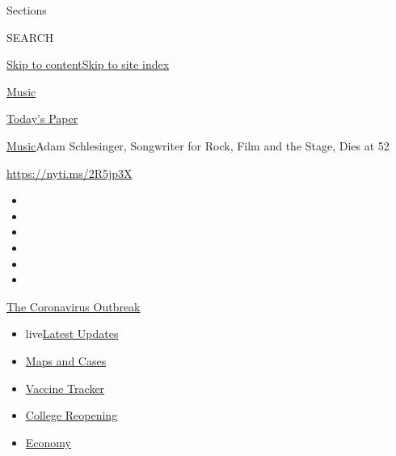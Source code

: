 Sections

SEARCH

\protect\hyperlink{site-content}{Skip to
content}\protect\hyperlink{site-index}{Skip to site index}

\href{https://www.nytimes.com/section/arts/music}{Music}

\href{https://myaccount.nytimes.com/auth/login?response_type=cookie\&client_id=vi}{}

\href{https://www.nytimes.com/section/todayspaper}{Today's Paper}

\href{/section/arts/music}{Music}\textbar{}Adam Schlesinger, Songwriter
for Rock, Film and the Stage, Dies at 52

\url{https://nyti.ms/2R5jp3X}

\begin{itemize}
\item
\item
\item
\item
\item
\item
\end{itemize}

\href{https://www.nytimes.com/news-event/coronavirus?action=click\&pgtype=Article\&state=default\&region=TOP_BANNER\&context=storylines_menu}{The
Coronavirus Outbreak}

\begin{itemize}
\tightlist
\item
  live\href{https://www.nytimes.com/2020/08/03/world/coronavirus-covid-19.html?action=click\&pgtype=Article\&state=default\&region=TOP_BANNER\&context=storylines_menu}{Latest
  Updates}
\item
  \href{https://www.nytimes.com/interactive/2020/us/coronavirus-us-cases.html?action=click\&pgtype=Article\&state=default\&region=TOP_BANNER\&context=storylines_menu}{Maps
  and Cases}
\item
  \href{https://www.nytimes.com/interactive/2020/science/coronavirus-vaccine-tracker.html?action=click\&pgtype=Article\&state=default\&region=TOP_BANNER\&context=storylines_menu}{Vaccine
  Tracker}
\item
  \href{https://www.nytimes.com/2020/08/02/us/covid-college-reopening.html?action=click\&pgtype=Article\&state=default\&region=TOP_BANNER\&context=storylines_menu}{College
  Reopening}
\item
  \href{https://www.nytimes.com/live/2020/08/03/business/stock-market-today-coronavirus?action=click\&pgtype=Article\&state=default\&region=TOP_BANNER\&context=storylines_menu}{Economy}
\end{itemize}

